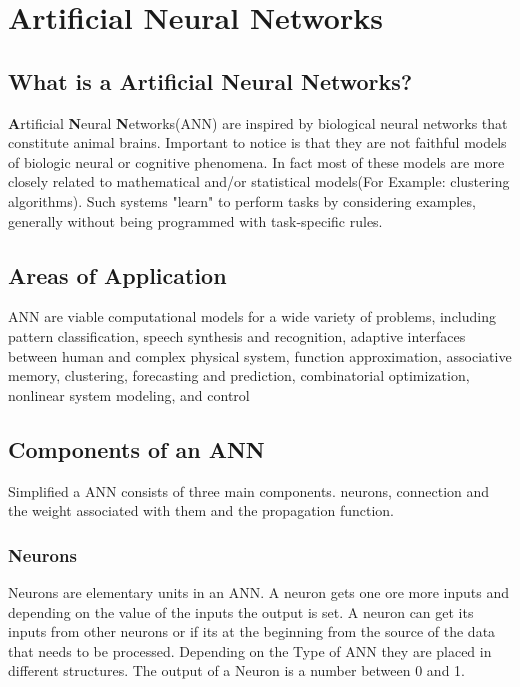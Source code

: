 \chapter{Artificial Neural Networks\authorB}

\section{What is a Artificial Neural Networks?}

  \textbf{A}rtificial \textbf{N}eural \textbf{N}etworks(ANN) are inspired by biological neural networks that constitute animal brains. Important to notice is that they are not faithful models of biologic neural or cognitive phenomena. In fact most of these models are more closely related to mathematical and/or statistical models(For Example: clustering algorithms). Such systems "learn" to perform tasks by considering examples, generally without being programmed with task-specific rules. 
 
\section{Areas of Application}

 ANN are viable computational models for a wide variety of problems, including pattern classification, speech synthesis and recognition, adaptive interfaces between human and complex physical system, function approximation, associative memory, clustering, forecasting and prediction, combinatorial optimization, nonlinear system modeling, and control
 
\section{Components of an ANN}

Simplified a ANN consists of three main components. neurons, connection and the weight associated with them and the propagation function.

\subsection{Neurons}

Neurons are elementary units in an ANN. A neuron gets one ore more inputs and depending on the value of the inputs the output is set. A neuron can get its inputs from other neurons or if its at the beginning from the source of the data that needs to be processed. Depending on the Type of ANN they are placed in different structures. The output of a Neuron is a number between 0 and 1. 

